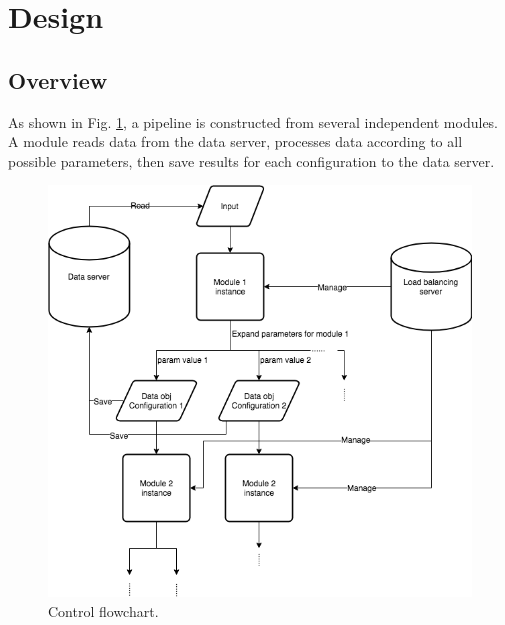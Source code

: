 \documentclass{article}
\begin{document}
\section{Design}

    \subsection{Overview}

    As shown in Fig. \ref{fig:control_flow},
    a pipeline is constructed from several independent modules.
    A module reads data from the data server,
    processes data according to all possible parameters,
    then save results for each configuration to the data server.

    \begin{figure}[h]
        \begin{center}
            \includegraphics[width=\textwidth]{fig/control_flow.png}
        \end{center}
        \label{fig:control_flow}
        \caption{Control flowchart.}
    \end{figure}
\end{document}
